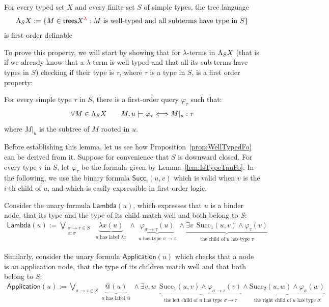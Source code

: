 \begin{proposition}\label{prop:WellTypedFo}
    For every typed set $X$ and every finite set $S$ of simple types, the tree language 
    \begin{align*}
    \Lambda_{S} X  := \{ M \in \mathsf {trees} {X}^{{\color{red}{\lambda}}} : \text{$M$ is well-typed and all subterms have type in $S$}\}
    \end{align*}
    is first-order definable 
\end{proposition}

To prove this property, we will start by showing that for $\lambda$-terms in $\Lambda_{S} X$ (that is if we already know that a $\lambda$-term is well-typed and that all its sub-terms have types in $S$) checking if their type is $\tau$, where $\tau$ is a type in $S$, is a first order property:
\begin{lemma}\label{lem:IsTypeTauFo}
For every simple type $\tau$ in $S$, there is a first-order query $\varphi_\tau$ such that:
$$ \forall M\in \Lambda_{S} X \qquad M,u \models \varphi_\tau \Longleftrightarrow M|_u:\tau$$
where $M|_u$ is the subtree of $M$ rooted in $u$. 
\end{lemma}
Before establishing this lemma, let us see how Proposition~\ref{prop:WellTypedFo} can be derived from it. Suppose for convenience that $S$ is downward closed. For every type $\tau$ in $S$, let $\varphi_\tau$ be the formula given by Lemma~\ref{lem:IsTypeTauFo}. In the following, we use the binary formula
 $\mathsf{Succ}_{i}(u,v)$ which is valid when $v$ is the $i$-th child of $u$, and which is easily expressible in first-order logic.
 \smallskip
 
Consider the unary formula $\mathsf{Lambda}(u)$, which expresses that $u$ is a binder node, that its type and the type of its child match well and both belong to $S$: 
\begin{align*}
\mathsf{Lambda}(u) := \bigvee_{\substack{\sigma\rightarrow\tau \in S\\x:\sigma}} \underbrace{\lambda x(u)}_{\substack{\text{$u$ has label $\lambda x$}}} \wedge \underbrace{\varphi_{\sigma\rightarrow\tau}(u)}_{\substack{\text{$u$ has type $\sigma\rightarrow\tau$}}}  \wedge \underbrace{\exists v\ \ \mathrm{Succ}_1(u, v) \wedge \varphi_\tau (v)}_{\substack{\text{the child of $u$ has type $\tau$}}}
\end{align*}

Similarly, consider the unary formula $\mathsf{Application}(u)$ which checks that a node is an application node, that the type of its children match well and that both belong to $S$: 
\begin{align*}
\mathsf{Application}(u) := \bigvee_{\sigma\rightarrow\tau \in S} \underbrace{@(u)}_{\substack{\text{$u$ has label @}}}  \wedge \exists v, w\ \ \underbrace{\mathrm{Succ}_1(u, v) \wedge \varphi_{\sigma\rightarrow\tau} (v)}_{\substack{\text{the left child of $u$ has type $\sigma\rightarrow\tau$}}} \wedge \underbrace{\mathrm{Succ}_2(u, w) \wedge \varphi_{\sigma} (w)}_{\substack{\text{the right child of $u$ has type $\sigma$}}}
\end{align*}

